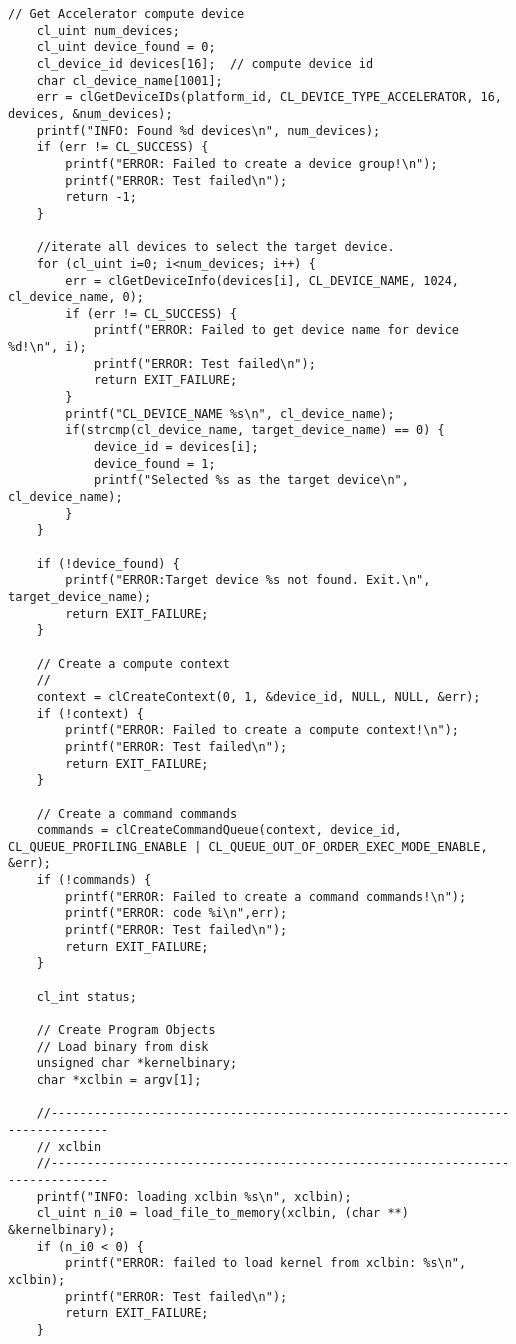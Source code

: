\begin{lstlisting}[label=code:hostexample3, caption=Содержимое файла host\_example.cpp, basicstyle=\tiny]
    // Get Accelerator compute device
    cl_uint num_devices;
    cl_uint device_found = 0;
    cl_device_id devices[16];  // compute device id
    char cl_device_name[1001];
    err = clGetDeviceIDs(platform_id, CL_DEVICE_TYPE_ACCELERATOR, 16, devices, &num_devices);
    printf("INFO: Found %d devices\n", num_devices);
    if (err != CL_SUCCESS) {
        printf("ERROR: Failed to create a device group!\n");
        printf("ERROR: Test failed\n");
        return -1;
    }

    //iterate all devices to select the target device.
    for (cl_uint i=0; i<num_devices; i++) {
        err = clGetDeviceInfo(devices[i], CL_DEVICE_NAME, 1024, cl_device_name, 0);
        if (err != CL_SUCCESS) {
            printf("ERROR: Failed to get device name for device %d!\n", i);
            printf("ERROR: Test failed\n");
            return EXIT_FAILURE;
        }
        printf("CL_DEVICE_NAME %s\n", cl_device_name);
        if(strcmp(cl_device_name, target_device_name) == 0) {
            device_id = devices[i];
            device_found = 1;
            printf("Selected %s as the target device\n", cl_device_name);
        }
    }

    if (!device_found) {
        printf("ERROR:Target device %s not found. Exit.\n", target_device_name);
        return EXIT_FAILURE;
    }

    // Create a compute context
    //
    context = clCreateContext(0, 1, &device_id, NULL, NULL, &err);
    if (!context) {
        printf("ERROR: Failed to create a compute context!\n");
        printf("ERROR: Test failed\n");
        return EXIT_FAILURE;
    }

    // Create a command commands
    commands = clCreateCommandQueue(context, device_id, CL_QUEUE_PROFILING_ENABLE | CL_QUEUE_OUT_OF_ORDER_EXEC_MODE_ENABLE, &err);
    if (!commands) {
        printf("ERROR: Failed to create a command commands!\n");
        printf("ERROR: code %i\n",err);
        printf("ERROR: Test failed\n");
        return EXIT_FAILURE;
    }

    cl_int status;

    // Create Program Objects
    // Load binary from disk
    unsigned char *kernelbinary;
    char *xclbin = argv[1];

    //------------------------------------------------------------------------------
    // xclbin
    //------------------------------------------------------------------------------
    printf("INFO: loading xclbin %s\n", xclbin);
    cl_uint n_i0 = load_file_to_memory(xclbin, (char **) &kernelbinary);
    if (n_i0 < 0) {
        printf("ERROR: failed to load kernel from xclbin: %s\n", xclbin);
        printf("ERROR: Test failed\n");
        return EXIT_FAILURE;
    }


\end{lstlisting}
